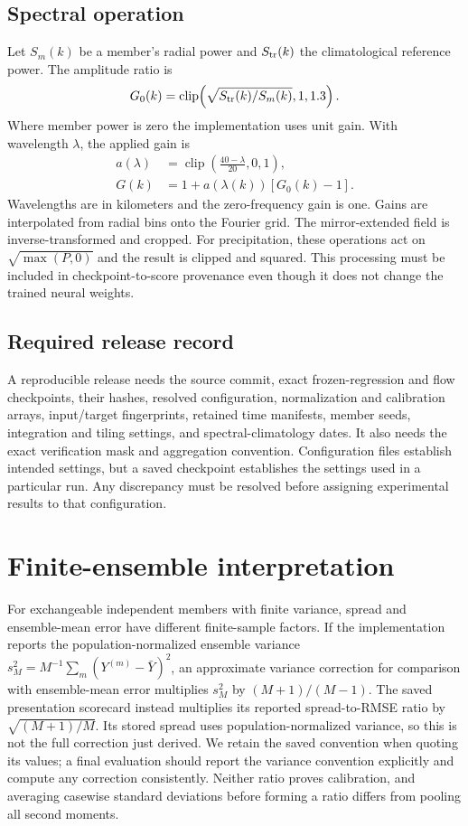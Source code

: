\documentclass[10pt]{article}
\begin{document}
\subsection{Spectral operation}
Let $S_m(k)$ be a member's radial power and $S_{\rm tr}(k)$ the climatological reference power. The amplitude ratio is
\begin{equation}
G_0(k)=\operatorname{clip}\!\left(
\sqrt{S_{\rm tr}(k)/S_m(k)},1,1.3\right).
\end{equation}
Where member power is zero the implementation uses unit gain. With wavelength $\lambda$, the applied gain is
\begin{align}
a(\lambda)&=\operatorname{clip}\!\left(\frac{40-\lambda}{20},0,1\right),\\
G(k)&=1+a(\lambda(k))[G_0(k)-1].
\end{align}
Wavelengths are in kilometers and the zero-frequency gain is one. Gains are interpolated from radial bins onto the Fourier grid. The mirror-extended field is inverse-transformed and cropped. For precipitation, these operations act on $\sqrt{\max(P,0)}$ and the result is clipped and squared. This processing must be included in checkpoint-to-score provenance even though it does not change the trained neural weights.

\subsection{Required release record}
A reproducible release needs the source commit, exact frozen-regression and flow checkpoints, their hashes, resolved configuration, normalization and calibration arrays, input/target fingerprints, retained time manifests, member seeds, integration and tiling settings, and spectral-climatology dates. It also needs the exact verification mask and aggregation convention. Configuration files establish intended settings, but a saved checkpoint establishes the settings used in a particular run. Any discrepancy must be resolved before assigning experimental results to that configuration.

\section{Finite-ensemble interpretation}\label{app:finite}
For exchangeable independent members with finite variance, spread and ensemble-mean error have different finite-sample factors. If the implementation reports the population-normalized ensemble variance $s_M^2=M^{-1}\sum_m(Y^{(m)}-\bar Y)^2$, an approximate variance correction for comparison with ensemble-mean error multiplies $s_M^2$ by $(M+1)/(M-1)$. The saved presentation scorecard instead multiplies its reported spread-to-RMSE ratio by $\sqrt{(M+1)/M}$. Its stored spread uses population-normalized variance, so this is not the full correction just derived. We retain the saved convention when quoting its values; a final evaluation should report the variance convention explicitly and compute any correction consistently. Neither ratio proves calibration, and averaging casewise standard deviations before forming a ratio differs from pooling all second moments.
\end{document}

